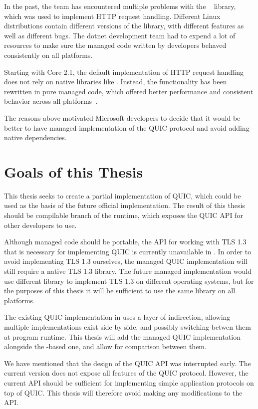 In the past, the \dotnet{} team has encountered multiple problems with the
\libcurl~\cite{curlGithub} library, which was used to implement HTTP request handling. Different
Linux distributions contain different versions of the \libcurl{} library, with different features as
well as different bugs. The dotnet{} development team had to expend a lot of resources to make sure
the managed code written by \dotnet{} developers behaved consistently on all platforms.

Starting with \dotnet{} Core 2.1, the default implementation of HTTP request handling does not rely on
native libraries like \libcurl{}. Instead, the functionality has been rewritten in pure managed
code, which offered better performance and consistent behavior across all \dotnet{}
platforms~\cite{SocketsHttpHandlerDocs}.

The reasons above motivated Microsoft developers to decide that it would be better to have managed
implementation of the QUIC protocol and avoid adding native dependencies.

\section{Goals of this Thesis}

This thesis seeks to create a partial implementation of QUIC, which could be used as the basis of
the future official \dotnet{} implementation. The result of this thesis should be compilable branch
of the \dotnet{} runtime, which exposes the QUIC API for other \dotnet{} developers to use.

Although managed code should be portable, the API for working with TLS 1.3 that is necessary for
implementing QUIC is currently unavailable in \dotnet{}. In order to avoid implementing TLS 1.3
ourselves, the managed QUIC implementation will still require a native TLS 1.3 library. The
future managed implementation would use different library to implement TLS 1.3 on different
operating systems, but for the purposes of this thesis it will be sufficient to use the same library
on all platforms.

The existing QUIC implementation in \dotnet{} uses a layer of indirection, allowing multiple
implementations exist side by side, and possibly switching betwen them at program runtime. This
thesis will add the managed QUIC implementation alongside the \libmsquic{}-based one, and allow for
comparison between them.

We have mentioned that the design of the QUIC API was interrupted early. The current version does
not expose all features of the QUIC protocol. However, the current API should be sufficient for
implementing simple application protocols on top of QUIC\@. This thesis will therefore avoid making
any modifications to the API\@.

